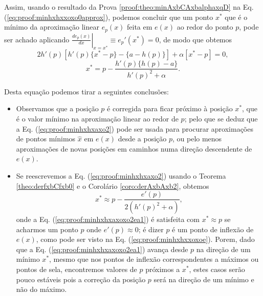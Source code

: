 \begin{myproofT}
Assim, usando o resultado da Prova \ref{proof:theo:minAxbCAxbalphaxqD} na Eq. (\ref{eq:proof:minhxhxxoxo0approx}), 
podemos concluir que um ponto $x^*$ que é 
o mínimo da aproximação linear $e_p(x)$ feita em $e(x)$ ao redor do ponto $p$,
pode ser achado aplicando $\left. \frac{d e_p(x)}{d x }\right|_{x=x^*} \equiv e_{p}'(x^*) =0$,
de modo que obtemos
\begin{equation}\label{eq:proof:minhxhxaxo2a}
 2 h'(p)[h'(p)\{x^*-p\} -\{a-h(p)\}] + \alpha [x^*-p] = 0,
\end{equation} 
\begin{equation}\label{eq:proof:minhxhxaxo2}
x^* = p - \frac{h'(p)\{h(p)-a\}}{ h'(p)^2+\alpha}.
\end{equation} 








Desta equação podemos tirar a seguintes conclusões:
\begin{itemize}

\item Observamos que a posição $p$ é corregida para ficar próximo à posição $x^*$, 
que é o valor mínimo na aproximação linear ao redor de $p$;
pelo que se deduz que a Eq. (\ref{eq:proof:minhxhxaxo2})
pode ser usada para procurar aproximações de pontos mínimos $\hat{x}$ em $e(x)$ desde a posição $p$,
ou pelo menos aproximações de novas posições em caminhos numa direção descendente de $e(x)$.

\item Se reescrevemos a Eq. (\ref{eq:proof:minhxhxaxo2}) usando o Teorema \ref{theo:derfxbCfxb0}
e o Corolário \ref{coro:derAxbAxb2},
obtemos
\begin{equation}\label{eq:proof:minhxhxaxoxo2ea1}
x^* \approx p - \frac{ e'(p)}{2(h'(p)^2+\alpha)},
\end{equation}
onde a Eq. (\ref{eq:proof:minhxhxaxoxo2ea1}) é satisfeita 
com $x^* \approx p$
se acharmos um  ponto $p$ onde  
$e'(p)\approx 0$; 
é dizer $p$ é um ponto de inflexão de $e(x)$, como pode ser visto na Eq. (\ref{eq:proof:minhxhxxoxoe}).
Porem, dado que a Eq. (\ref{eq:proof:minhxhxaxoxo2ea1}) avança desde $p$ na direção de um mínimo $x^*$, 
mesmo que nos pontos de inflexão correspondentes a máximos ou pontos de sela,
encontremos valores de $p$ próximos a $x^*$,
 estes casos serão pouco estáveis pois
a correção da posição $p$ será na direção de um mínimo e não do máximo.


\end{itemize}
\end{myproofT}
